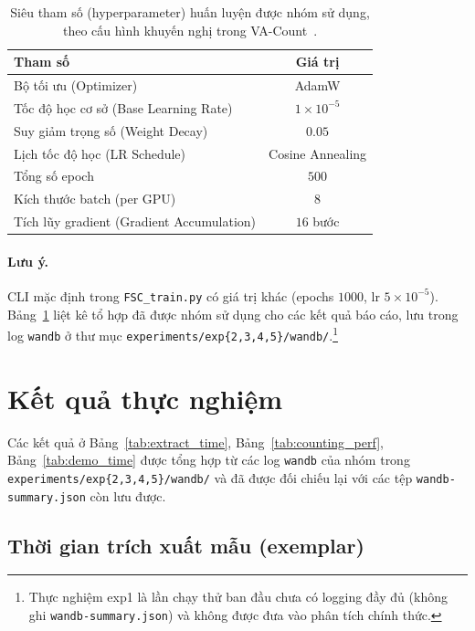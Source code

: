 \documentclass[a4paper,12pt]{report}
\numberwithin{figure}{chapter}
\numberwithin{table}{chapter}
\begin{document}
\begin{table}[H]
\centering
\renewcommand{\arraystretch}{1.2}
\begin{tabular}{|l|c|}
\hline
\rowcolor[HTML]{EFEFEF}
\textbf{Tham số} & \textbf{Giá trị} \\
\hline
Bộ tối ưu (Optimizer) & AdamW \\
\hline
Tốc độ học cơ sở (Base Learning Rate) & $1{\times}10^{-5}$ \\
\hline
Suy giảm trọng số (Weight Decay) & $0.05$ \\
\hline
Lịch tốc độ học (LR Schedule) & Cosine Annealing \\
\hline
Tổng số epoch & $500$ \\
\hline
Kích thước batch (per GPU) & $8$ \\
\hline
Tích lũy gradient (Gradient Accumulation) & $16$ bước \\
\hline
\end{tabular}
\caption{Siêu tham số (hyperparameter) huấn luyện được nhóm sử dụng, theo cấu hình khuyến nghị trong VA-Count~\cite{vacount}.}
\label{tab:hyperparams}
\end{table}

\paragraph{Lưu ý.}
CLI mặc định trong \texttt{FSC\_train.py} có giá trị khác
(epochs $1000$, lr $5{\times}10^{-5}$).
Bảng~\ref{tab:hyperparams} liệt kê tổ hợp đã được nhóm sử dụng cho các
kết quả báo cáo, lưu trong log \texttt{wandb} ở thư mục
\texttt{experiments/exp\{2,3,4,5\}/wandb/}.\footnote{Thực nghiệm exp1 là lần chạy thử ban đầu chưa có logging đầy đủ (không ghi \texttt{wandb-summary.json}) và không được đưa vào phân tích chính thức.}

\section{Kết quả thực nghiệm}
\label{sec:results}

Các kết quả ở Bảng~\ref{tab:extract_time}, Bảng~\ref{tab:counting_perf},
Bảng~\ref{tab:demo_time} được tổng hợp từ các log \texttt{wandb} của nhóm
trong \mbox{\texttt{experiments/exp\{2,3,4,5\}/wandb/}}
và đã được đối chiếu lại với các tệp \texttt{wandb-summary.json} còn lưu được.

\subsection{Thời gian trích xuất mẫu (exemplar)}
\end{document}
